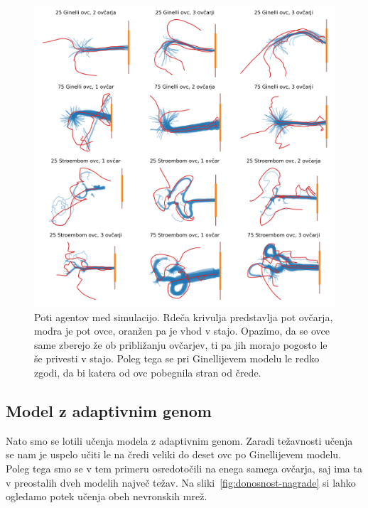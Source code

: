 \begin{figure}[H]  %
	\centering
	\includegraphics[width=\textwidth]{../poglavja/grafi/lokacijeAI1.png}
	\caption[Poti agentov med simulacijo]{Poti agentov med simulacijo. Rdeča krivulja predstavlja pot ovčarja, modra je pot ovce, oranžen pa je vhod v stajo. Opazimo, da se ovce same zberejo že ob približanju ovčarjev, ti pa jih morajo pogosto le še privesti v stajo. Poleg tega se pri Ginellijevem modelu le redko zgodi, da bi katera od ovc pobegnila stran od črede.} %
	\label{fig:lokacije}
\end{figure}

\subsection{Model z adaptivnim genom}

Nato smo se lotili učenja modela z adaptivnim genom. Zaradi težavnosti učenja se nam je uspelo učiti le na čredi veliki do deset ovc po Ginellijevem modelu. Poleg tega smo se v tem primeru osredotočili na enega samega ovčarja, saj ima ta v preostalih dveh modelih največ težav. Na sliki~\ref{fig:donosnost-nagrade} si lahko ogledamo potek učenja obeh nevronskih mrež.

